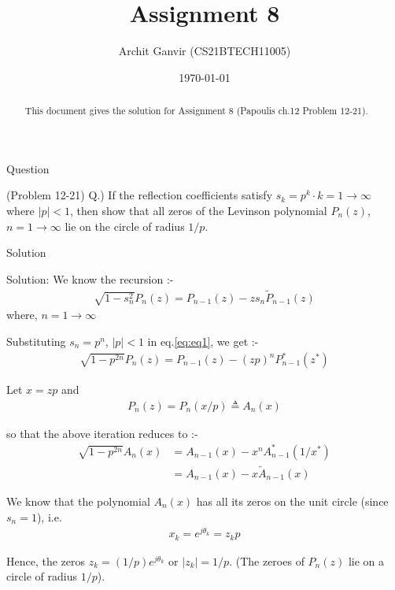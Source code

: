 \documentclass{beamer}
\title{Assignment 8}
\author{Archit Ganvir (CS21BTECH11005)}
\date{\today}
\begin{document}
\providecommand{\brak}[1]{\ensuremath{\left(#1\right)}}
\begin{frame}

\titlepage

\begin{abstract}
This document gives the solution for Assignment 8 (Papoulis ch.12 Problem 12-21).
\end{abstract}

\end{frame}

\logo{}

\begin{frame}{Question}

(Problem 12-21) Q.) If the reflection coefficients satisfy $s_k = p^k \cdot k = 1 \rightarrow \infty$ where $|p| < 1$, then show that all zeros of the Levinson polynomial $P_n(z)$, $n = 1 \rightarrow \infty$ lie on the circle of radius $1 / p$.

\end{frame}

\begin{frame}{Solution}

Solution: We know the recursion :-
\begin{align}
\sqrt{1 - s_n^2} P_n(z) = P_{n - 1}(z) - z s_n \tilde{P}_{n - 1}(z) \label{eq:eq1}
\end{align}
where, $n = 1 \rightarrow \infty$

Substituting $s_n = p^n$, $|p| < 1$ in eq.\eqref{eq:eq1}, we get :-
\begin{align}
\sqrt{1 - p^{2n}} P_n(z) = P_{n - 1}(z) - (z p)^n P_{n - 1}^*(z^*)
\end{align}


\end{frame}

\begin{frame}

Let $x = z p$ and
\begin{align}
P_n(z) = P_n(x / p) \triangleq A_n(x)
\end{align}

so that the above iteration reduces to :-
\begin{align}
\sqrt{1 - p^{2n}} A_n(x) &= A_{n - 1}(x) - x^n A_{n - 1}^*(1 / x^*) \\
&= A_{n - 1}(x) - x \tilde{A}_{n - 1}(x)
\end{align}

\end{frame}

\begin{frame}

We know that the polynomial $A_n(x)$ has all its zeros on the unit circle (since $s_n = 1$), i.e.
\begin{align}
x_k = e^{j \theta _k} = z_k p
\end{align}

Hence, the zeros $z_k = (1 / p) e^{j \theta _k}$ or $|z_k| = 1 / p$. (The zeroes of $P_n(z)$ lie on a circle of radius $1/p$).

\end{frame}
\end{document}
